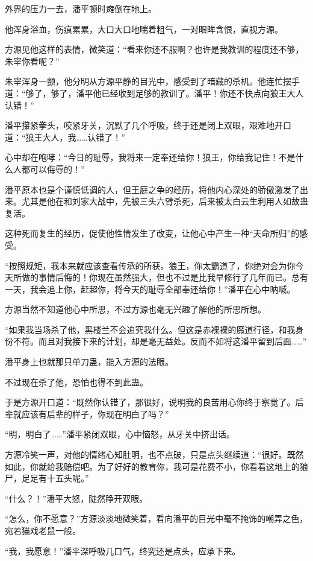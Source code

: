 \begin{this_body}
外界的压力一去，潘平顿时瘫倒在地上。

他浑身浴血，伤痕累累，大口大口地喘着粗气，一对眼眸含恨，直视方源。

方源见他这样的表情，微笑道：“看来你还不服啊？也许是我教训的程度还不够，朱宰你看呢？”

朱宰浑身一颤，他分明从方源平静的目光中，感受到了暗藏的杀机。他连忙摆手道：“够了，够了，潘平他已经收到足够的教训了。潘平！你还不快点向狼王大人认错！”

潘平攥紧拳头，咬紧牙关，沉默了几个呼吸，终于还是闭上双眼，艰难地开口道：“狼王大人，我……认错了！”

心中却在咆哮：“今日的耻辱，我将来一定奉还给你！狼王，你给我记住！不是什么人都可以侮辱的！”

潘平原本也是个谨慎低调的人，但王庭之争的经历，将他内心深处的骄傲激发了出来。尤其是他在和刘家大战中，先被三头六臂杀死，后来被太白云生利用人如故蛊复活。

这种死而复生的经历，促使他性情发生了改变，让他心中产生一种“天命所归”的感受。

“按照规矩，我本来就应该查看传承的所获。狼王，你太霸道了，你绝对会为你今天所做的事情后悔的！你现在虽然强大，但也不过是比我早修行了几年而已。总有一天，我会追上你，赶超你，将今天的耻辱全部奉还给你！”潘平在心中呐喊。

方源当然不知道他心中所思，不过方源也毫无兴趣了解他的所思所想。

“如果我当场杀了他，黑楼兰不会追究我什么。但这是赤裸裸的魔道行径，和我身份不符。而且对我接下来的计划，却是毫无益处。反而不如将这潘平留到后面……”

潘平身上也就那只单刀蛊，能入方源的法眼。

不过现在杀了他，恐怕也得不到此蛊。

于是方源开口道：“既然你认错了，那很好，说明我的良苦用心你终于察觉了。后辈就应该有后辈的样子，你现在明白了吗？”

“明，明白了……”潘平紧闭双眼，心中恼怒，从牙关中挤出话。

方源冷笑一声，对他的情绪心知肚明，也不点破，只是点头继续道：“很好。既然如此，你就给我赔偿吧。为了好好的教育你，我可是花费不小，你看看这地上的狼尸，足足有十五头呢。”

“什么？！”潘平大怒，陡然睁开双眼。

“怎么，你不愿意？”方源淡淡地微笑着，看向潘平的目光中毫不掩饰的嘲弄之色，宛若猫戏老鼠一般。

“我，我愿意！”潘平深呼吸几口气，终究还是点头，应承下来。


\end{this_body}
